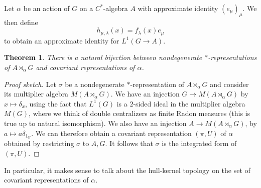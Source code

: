 \documentclass[12pt]{report}
\newtheorem{theorem}{Theorem}[chapter]
\theoremstyle{definition}
\begin{document}
    Let $\alpha$ be an action of $G$ on a $C^*$-algebra $A$ with approximate identity $(e_\mu)_\mu$. We then define
    $$h_{\mu,\lambda}(x) = f_\lambda(x) e_\mu$$
    to obtain an approximate identity for $L^1(G \to A)$.

\begin{theorem}
    There is a natural bijection between nondegenerate $*$-representations of $A \rtimes_\alpha G$ and covariant representations of $\alpha$. 
\end{theorem}
\begin{proof}[Proof sketch]
    Let $\sigma$ be a nondegenerate $*$-representation of $A \rtimes_\alpha G$ and consider its multiplier algebra $M(A \rtimes_\alpha G)$. We have an injection $G \to M(A \rtimes_\alpha G)$ by $x \mapsto \delta_x$, using the fact that $L^1(G)$ is a $2$-sided ideal in the multiplier algebra $M(G)$, where we think of double centralizers as finite Radon measures (this is true up to natural isomorphism). We also have an injection $A \to M(A \rtimes_\alpha G)$, by $a \mapsto a \delta_{1_G}$. We can therefore obtain a covariant representation $(\pi, U)$ of $\alpha$ obtained by restricting $\sigma$ to $A,G$. It follows that $\sigma$ is the integrated form of $(\pi, U)$.
\end{proof}
    In particular, it makes sense to talk about the hull-kernel topology on the set of covariant representations of $\alpha$.
\end{document}
